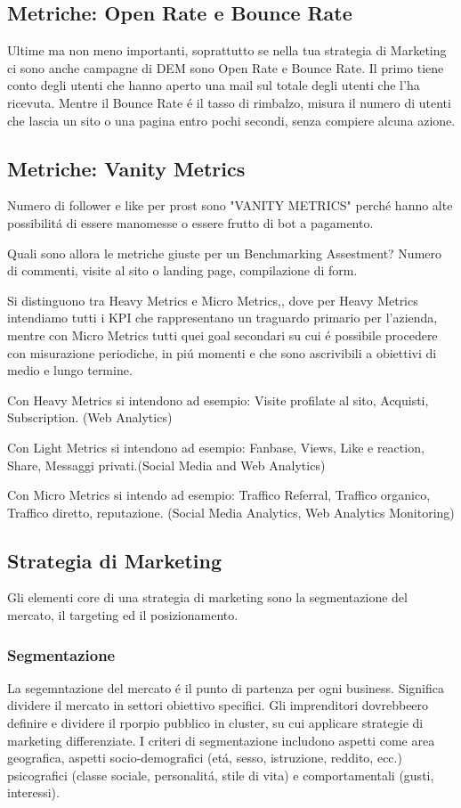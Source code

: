 \documentclass{article}
\begin{document}
\subsection{Metriche: Open Rate e Bounce Rate}
Ultime ma non meno importanti, soprattutto se nella tua strategia di Marketing ci sono anche campagne di DEM sono Open Rate e Bounce Rate. Il primo tiene conto degli utenti che hanno aperto una mail sul totale degli utenti che l'ha ricevuta. Mentre il Bounce Rate \'e il tasso di rimbalzo, misura il numero di utenti che lascia un sito o una pagina entro pochi secondi, senza compiere alcuna azione.

\subsection{Metriche: Vanity Metrics}
Numero di follower e like per prost sono "VANITY METRICS" perch\'e hanno alte possibilit\'a di essere manomesse o essere frutto di bot a pagamento.

Quali sono allora le metriche giuste per un Benchmarking Assestment? Numero di commenti, visite al sito o landing page, compilazione di form.

Si distinguono tra Heavy Metrics e Micro Metrics,, dove per Heavy Metrics intendiamo tutti i KPI che rappresentano un traguardo primario per l'azienda, mentre con Micro Metrics tutti quei goal secondari su cui \'e possibile procedere con misurazione periodiche, in pi\'u momenti e che sono ascrivibili a obiettivi di medio e lungo termine.

Con Heavy Metrics si intendono ad esempio: Visite profilate al sito, Acquisti, Subscription. (Web Analytics)

Con Light Metrics si intendono ad esempio: Fanbase, Views, Like e reaction, Share, Messaggi privati.(Social Media and Web Analytics)

Con Micro Metrics si intendo ad esempio: Traffico Referral, Traffico organico, Traffico diretto, reputazione. (Social Media Analytics, Web Analytics Monitoring)

\subsection{Strategia di Marketing}
Gli elementi core di una strategia di marketing sono la segmentazione del mercato, il targeting ed il posizionamento. 

\subsubsection{Segmentazione}
La segemntazione del mercato \'e il punto di partenza per ogni business. Significa dividere il mercato in settori obiettivo specifici. Gli imprenditori dovrebbeero definire e dividere il rporpio pubblico in cluster, su cui applicare strategie di marketing differenziate. I criteri di segmentazione includono aspetti come area geografica, aspetti socio-demografici (et\'a, sesso, istruzione, reddito, ecc.) psicografici (classe sociale, personalit\'a, stile di vita) e comportamentali (gusti, interessi).
\end{document}
